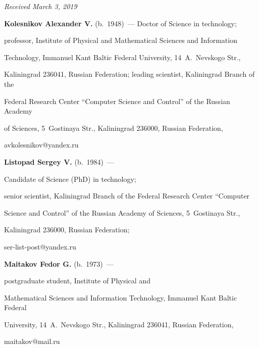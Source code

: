 \hfill{\small\textit{Received March 3, 2019}} 


  


  \Contr


  


 \noindent


 \textbf{Kolesnikov Alexander V.} (b.\ 1948)~--- Doctor of Science in technology; 


professor, Institute of Physical and Mathematical Sciences and Information 


Technology, Immanuel Kant Baltic Federal University, 14~A.~Nevskogo Str., 


Kaliningrad 236041, Russian Federation; leading scientist, Kaliningrad Branch of the 


Federal Research Center ``Computer Science and Control'' of the Russian Academy 


of Sciences, 5~Gostinaya Str., Kaliningrad 236000, Russian Federation, 


\mbox{avkolesnikov@yandex.ru} 





\vspace*{3pt}





  \noindent


 \textbf{Listopad Sergey V.} (b.\ 1984)~--- 


 Candidate of  Science (PhD) in technology; 


senior scientist, Kaliningrad Branch of the Federal Research Center ``Computer 


Science and Control'' of the Russian Academy of Sciences, 5~Gostinaya Str., 


Kaliningrad 236000, Russian Federation; 


\mbox{ser-list-post@yandex.ru}


  


  


  \vspace*{3pt}





  \noindent


 \textbf{Maitakov Fedor G.} (b.\ 1973)~--- 


 postgraduate student, Institute of Physical and 


Mathematical Sciences and Information Technology, Immanuel Kant Baltic Federal 


University, 14~A.~Nevskogo Str., Kaliningrad 236041, Russian Federation, 


\mbox{maitakov@mail.ru} 


   


\label{end\stat}








\renewcommand{\bibname}{\protect\rm Литература}





    


